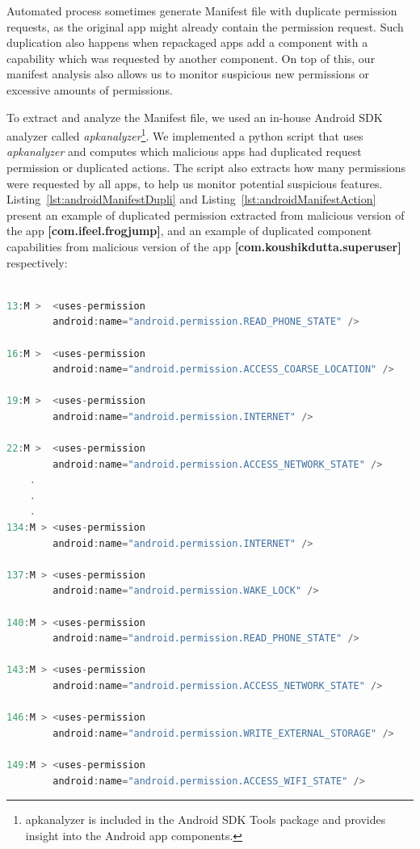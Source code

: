 Automated process sometimes generate Manifest file with duplicate permission requests, as the original app might already contain the permission request. Such duplication also happens when repackaged apps add a component with a capability which was requested by another component. On top of this, our manifest analysis also allows us to monitor suspicious new permissions or excessive amounts of permissions. 

To extract and analyze the Manifest file, we used an in-house Android SDK analyzer called \textit{apkanalyzer}\footnote{apkanalyzer is included in the Android SDK Tools package and provides insight into the Android app components.}. We implemented a python script that uses \textit{apkanalyzer} and computes which malicious apps had duplicated request permission or duplicated actions. The script also extracts how many permissions were requested by all apps, to help us monitor potential suspicious features. Listing~\ref{lst:androidManifestDupli} and Listing~\ref{lst:androidManifestAction} present an example of duplicated permission extracted from malicious version of the app \textbf{[com.ifeel.frogjump]}, and an example of duplicated component capabilities from malicious version of the app \textbf{[com.koushikdutta.superuser]} respectively:


\begin{lstlisting}[caption={Example of duplicated permission from malicious version of app (com.ifeel.frogjump)}, language=Java,
    basicstyle=\fontsize{6}{5}\selectfont\ttfamily,
    label={lst:androidManifestDupli}]

13:M >  <uses-permission
        android:name="android.permission.READ_PHONE_STATE" />

16:M >  <uses-permission
        android:name="android.permission.ACCESS_COARSE_LOCATION" />

19:M >  <uses-permission
        android:name="android.permission.INTERNET" />

22:M >  <uses-permission
        android:name="android.permission.ACCESS_NETWORK_STATE" />
    .
    .
    .
134:M > <uses-permission
        android:name="android.permission.INTERNET" />

137:M > <uses-permission
        android:name="android.permission.WAKE_LOCK" />

140:M > <uses-permission
        android:name="android.permission.READ_PHONE_STATE" />

143:M > <uses-permission
        android:name="android.permission.ACCESS_NETWORK_STATE" />

146:M > <uses-permission
        android:name="android.permission.WRITE_EXTERNAL_STORAGE" />

149:M > <uses-permission
        android:name="android.permission.ACCESS_WIFI_STATE" />
\end{lstlisting}

